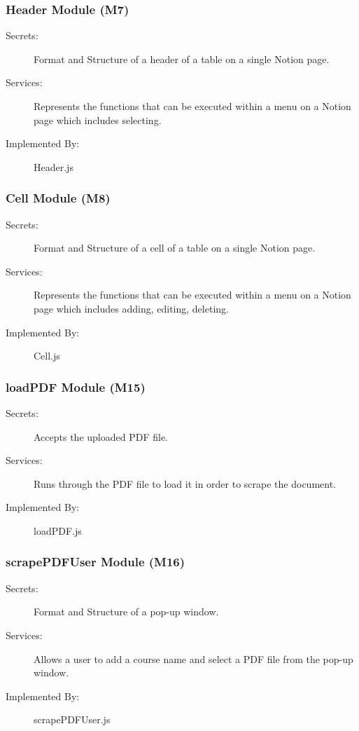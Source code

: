 \documentclass[12pt, titlepage]{article}
\begin{document}
\subsubsection{Header Module (M7)}

\begin{description}
\item[Secrets:] Format and Structure of a header of a table on a single Notion page.
\item[Services:] Represents the functions that can be executed within a menu on a Notion page which includes selecting.
\item[Implemented By:] Header.js
\end{description}

\subsubsection{Cell Module (M8)}

\begin{description}
\item[Secrets:] Format and Structure of a cell of a table on a single Notion page.
\item[Services:] Represents the functions that can be executed within a menu on a Notion page which includes adding, editing, deleting.
\item[Implemented By:] Cell.js
\end{description}

\subsubsection{loadPDF Module (M15)}

\begin{description}
\item[Secrets:] Accepts the uploaded PDF file.
\item[Services:] Runs through the PDF file to load it in order to scrape the document.
\item[Implemented By:] loadPDF.js
\end{description}

\subsubsection{scrapePDFUser Module (M16)}

\begin{description}
\item[Secrets:] Format and Structure of a pop-up window.
\item[Services:] Allows a user to add a course name and select a PDF file from the pop-up window.
\item[Implemented By:] scrapePDFUser.js
\end{description}
\end{document}
